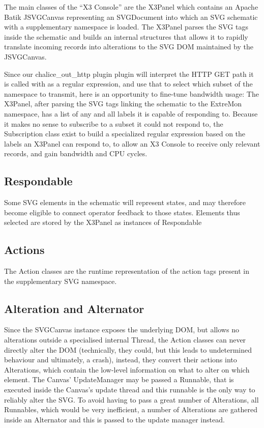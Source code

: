 The main classes of the ``X3 Console'' are the X3Panel which contains
an Apache Batik JSVGCanvas representing an SVGDocument into which an
SVG schematic with a supplementary namespace is loaded.
The X3Panel parses the SVG tags inside the schematic
and builds an internal structures that allows it to rapidly translate
incoming \diffproto{} records into alterations to the SVG DOM maintained
by the JSVGCanvas.


Since our chalice\_out\_http plugin plugin will interpret the HTTP GET
path it is called with as a regular expression, and use that to select
which subset of the namespace to transmit, here is an opportunity to
fine-tune bandwidth usage: The X3Panel, after parsing the SVG tags
linking the schematic to the ExtreMon namespace, has a list of any
and all \diffproto{} labels it is capable of responding to. Because
it makes no sense to subscribe to a subset it could not respond to,
the Subscription class exist to build a specialized regular expression
based on the labels an X3Panel can respond to, to allow an X3 Console
to receive only relevant records, and gain bandwidth and CPU cycles.

\subsection{Respondable}

Some SVG elements in the schematic will represent states, and may
therefore become eligible to connect operator feedback to those
states. Elements thus selected are stored by the X3Panel as instances
of Respondable

\subsection{Actions}

The Action classes are the runtime representation of the action tags
present in the supplementary SVG namespace.

\subsection{Alteration and Alternator}

Since the SVGCanvas instance exposes the underlying DOM, but allows no
alterations outside a specialised internal Thread, the Action classes can
never directly alter the DOM (technically, they could, but this leads to
undetermined behaviour and ultimately, a crash), instead, they convert
their actions into Alterations, which contain the low-level information on
what to alter on which element. The Canvas' UpdateManager may be passed
a Runnable, that is executed inside the Canvas's update thread and this
runnable is the only way to reliably alter the SVG.  To avoid having to
pass a great number of Alterations, all Runnables, which would be very
inefficient, a number of Alterations are gathered inside an Alternator and
this is passed to the update manager instead.

